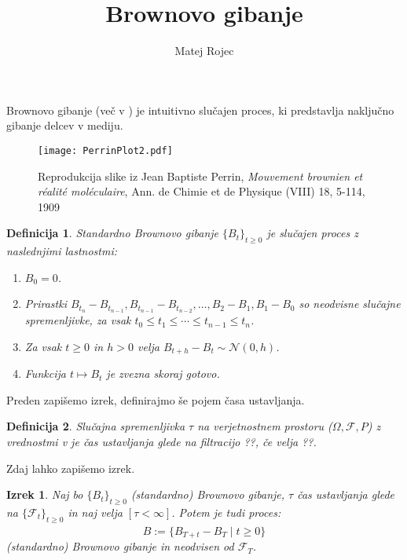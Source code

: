 \documentclass[11pt]{article}
\title{Brownovo gibanje}
\author{Matej Rojec}
\date{}
\newtheorem{definition}{Definicija}
\newtheorem{theorem}{Izrek}
\begin{document}
\maketitle
\paragraph{}
Brownovo gibanje (več v \cite{karatzas1991brownian}) je intuitivno slučajen proces, %
ki predstavlja naključno gibanje delcev v mediju.

\renewcommand{\figurename}{Slika}
\begin{figure}[h!]
  \centering
  \texttt{[image: PerrinPlot2.pdf]}
         \caption{Reprodukcija slike iz Jean Baptiste Perrin, \emph{Mouvement brownien et réalité moléculaire}, Ann. de Chimie et de Physique (VIII) 18, 5-114, 1909}
       \end{figure}

   \begin{definition}
     \normalfont Standardno Brownovo gibanje $\{B_t\}_{t \geq 0}$ je slučajen proces z naslednjimi lastnostmi: 
         \begin{enumerate}
            \item $B_0 = 0$.
            \item Prirastki $B_{t_n} - B_{t_{n-1}}, B_{t_{n-1}} - B_{t_{n-2}}, \ldots, B_2 - B_1, B_1 - B_0$ so neodvisne slučajne spremenljivke, za vsak $t_0 \leq t_1 \leq \cdots \leq t_{n-1} \leq t_n$.
            \item Za vsak $t \geq 0$ in $h > 0$ velja $B_{t+h} - B_t \sim \mathcal{N}(0, h)$.
            \item Funkcija $t \mapsto B_t$ je zvezna skoraj gotovo.
         \end{enumerate}
   \end{definition}
    
    Preden zapišemo izrek, definirajmo še pojem časa ustavljanja.
    
   \begin{definition}
     \normalfont Slučajna spremenljivka $\tau$ na verjetnostnem prostoru ($\Omega, \mathcal{F}, P$) z vrednostmi v %
     je \emph{čas ustavljanja} glede na filtracijo ??, če velja ??.
   \end{definition}
    
    Zdaj lahko zapišemo izrek. %
    
    \begin{theorem}
      \normalfont Naj bo $\{B_t\}_{t \geq 0}$ (standardno) Brownovo gibanje, $\tau$ čas ustavljanja glede na 
      $\{\mathcal{F}_t\}_{t \geq 0}$ in naj velja $[\tau<\infty]$.
      Potem je tudi proces:
      \[
      \hat{B} := \{B_{T+t} - B_T \mid t \geq 0\}
      \]
      (standardno) Brownovo gibanje in neodvisen od $\mathcal{F}_T$.
    \end{theorem}
    \printbibliography[title={Literatura}]
\end{document}
